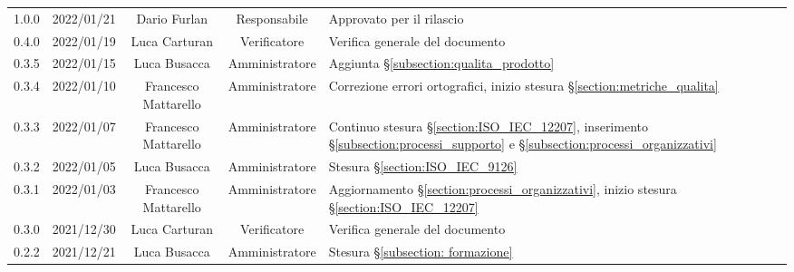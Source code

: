 \begin{center}
\begin{longtable}[c]{c | c | c | c | p{5cm}}
		1.0.0                                                      & 2022/01/21 & Dario Furlan                         & Responsabile   & Approvato per il rilascio                                                                                                                 \\
		0.4.0                                                      & 2022/01/19 & Luca Carturan                        & Verificatore   & Verifica generale del documento                                                                                                           \\
		0.3.5                                                      & 2022/01/15 & Luca Busacca                         & Amministratore & Aggiunta §\ref{subsection:qualita_prodotto}                                                                                               \\
		0.3.4                                                      & 2022/01/10 & Francesco Mattarello                 & Amministratore & Correzione errori ortografici, inizio stesura §\ref{section:metriche_qualita}                                                             \\
		0.3.3                                                      & 2022/01/07 & Francesco Mattarello                 & Amministratore & Continuo stesura §\ref{section:ISO_IEC_12207}, inserimento §\ref{subsection:processi_supporto} e §\ref{subsection:processi_organizzativi} \\
		0.3.2                                                      & 2022/01/05 & Luca Busacca                         & Amministratore & Stesura §\ref{section:ISO_IEC_9126}                                                                                                       \\
		0.3.1                                                      & 2022/01/03 & Francesco Mattarello                 & Amministratore & Aggiornamento §\ref{section:processi_organizzativi}, inizio stesura §\ref{section:ISO_IEC_12207}                                          \\
		0.3.0                                                      & 2021/12/30 & Luca Carturan                        & Verificatore   & Verifica generale del documento                                                                                                           \\
		0.2.2                                                      & 2021/12/21 & Luca Busacca                         & Amministratore & Stesura §\ref{subsection: formazione}                                                                                                     \\

\end{longtable}
\end{center}
